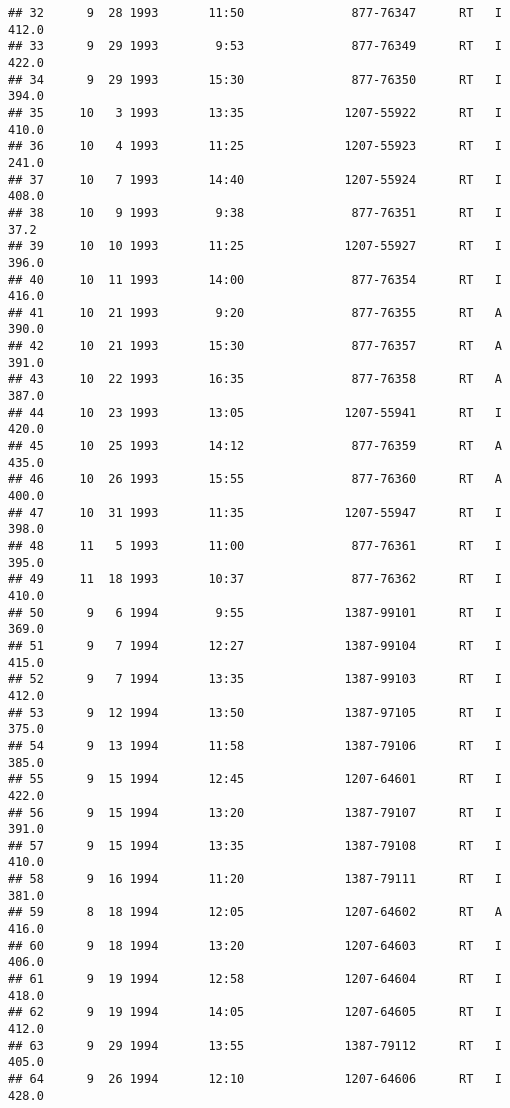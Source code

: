 \documentclass[
]{article}
\begin{document}
\begin{verbatim}
## 32      9  28 1993       11:50               877-76347      RT   I     412.0
## 33      9  29 1993        9:53               877-76349      RT   I     422.0
## 34      9  29 1993       15:30               877-76350      RT   I     394.0
## 35     10   3 1993       13:35              1207-55922      RT   I     410.0
## 36     10   4 1993       11:25              1207-55923      RT   I     241.0
## 37     10   7 1993       14:40              1207-55924      RT   I     408.0
## 38     10   9 1993        9:38               877-76351      RT   I      37.2
## 39     10  10 1993       11:25              1207-55927      RT   I     396.0
## 40     10  11 1993       14:00               877-76354      RT   I     416.0
## 41     10  21 1993        9:20               877-76355      RT   A     390.0
## 42     10  21 1993       15:30               877-76357      RT   A     391.0
## 43     10  22 1993       16:35               877-76358      RT   A     387.0
## 44     10  23 1993       13:05              1207-55941      RT   I     420.0
## 45     10  25 1993       14:12               877-76359      RT   A     435.0
## 46     10  26 1993       15:55               877-76360      RT   A     400.0
## 47     10  31 1993       11:35              1207-55947      RT   I     398.0
## 48     11   5 1993       11:00               877-76361      RT   I     395.0
## 49     11  18 1993       10:37               877-76362      RT   I     410.0
## 50      9   6 1994        9:55              1387-99101      RT   I     369.0
## 51      9   7 1994       12:27              1387-99104      RT   I     415.0
## 52      9   7 1994       13:35              1387-99103      RT   I     412.0
## 53      9  12 1994       13:50              1387-97105      RT   I     375.0
## 54      9  13 1994       11:58              1387-79106      RT   I     385.0
## 55      9  15 1994       12:45              1207-64601      RT   I     422.0
## 56      9  15 1994       13:20              1387-79107      RT   I     391.0
## 57      9  15 1994       13:35              1387-79108      RT   I     410.0
## 58      9  16 1994       11:20              1387-79111      RT   I     381.0
## 59      8  18 1994       12:05              1207-64602      RT   A     416.0
## 60      9  18 1994       13:20              1207-64603      RT   I     406.0
## 61      9  19 1994       12:58              1207-64604      RT   I     418.0
## 62      9  19 1994       14:05              1207-64605      RT   I     412.0
## 63      9  29 1994       13:55              1387-79112      RT   I     405.0
## 64      9  26 1994       12:10              1207-64606      RT   I     428.0

\end{verbatim}
\end{document}
